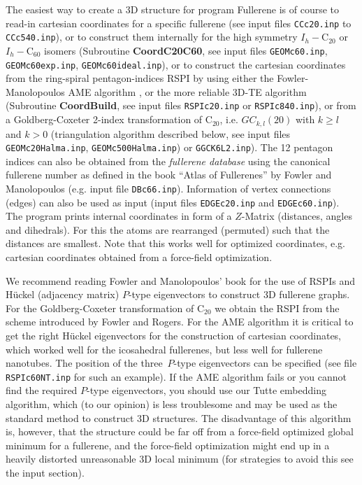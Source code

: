 \documentclass[article,a4paper,twoside]{memoir}
\newcommand{\C}[1]{\ensuremath{\mathrm{C}_{#1}}}
\newcommand{\filename}[1]{\texttt{#1}}
\newcommand{\funname}[1]{{\color{blue}\textbf{#1}}}
\begin{document}
The easiest way to create a 3D structure for program Fullerene is of course to read-in cartesian coordinates for a specific
fullerene (see input files \filename{CCc20.inp} to \filename{CCc540.inp}), or to construct them internally for the high
symmetry $I_h-$\C{20} or $I_h-$\C{60} isomers (Subroutine \funname{CoordC20C60}, see input files \filename{GEOMc60.inp},
\filename{GEOMc60exp.inp}, \filename{GEOMc60ideal.inp}), or to construct the cartesian coordinates from the ring-spiral
pentagon-indices RSPI by using either the Fowler-Manolopoulos AME algorithm \cite{Atlas},
or the more reliable 3D-TE algorithm (Subroutine \funname{CoordBuild}, see input files \filename{RSPIc20.inp} or \filename{RSPIc840.inp}),
or from a Goldberg-Coxeter 2-index transformation of \C{20}, i.e. $GC_{k,l}(20)$ with $k \geq l$ and $k > 0$
(triangulation algorithm described below, see input files \filename{GEOMc20Halma.inp}, \filename{GEOMc500Halma.inp}) or \filename{GGCK6L2.inp}). 
The 12 pentagon indices can also be obtained from the \textit{fullerene database} using 
the canonical fullerene number as defined in the book ``Atlas of Fullerenes'' by Fowler and Manolopoulos \cite{Atlas,cvetkovic2002} 
(e.g. input file \filename{DBc66.inp}). Information of vertex connections (edges) can also be used as input 
(input files \filename{EDGEc20.inp} and \filename{EDGEc60.inp}).
The program prints internal coordinates in form of a $Z$-Matrix (distances, angles and dihedrals).
For this the atoms are rearranged (permuted) such that the distances are smallest. Note that this works well for optimized
coordinates, e.g. cartesian coordinates obtained from a force-field optimization.

We recommend reading Fowler and Manolopoulos' book \cite{Atlas,cvetkovic2002} for the use of RSPIs and H\"uckel (adjacency matrix) $P$-type eigenvectors 
to construct 3D fullerene graphs. For the Goldberg-Coxeter transformation of \C{20} we obtain the RSPI from the scheme introduced by
Fowler and Rogers.\cite{Rogers} For the AME algorithm it is critical to get the right 
H\"uckel eigenvectors for the construction of cartesian coordinates,\cite{Atlas} which worked well for the icosahedral
fullerenes, but less well for fullerene nanotubes. 
The position of the three~$P$-type eigenvectors can be specified (see file \filename{RSPIc60NT.inp} for such an example).
If the AME algorithm fails or you cannot find the required $P$-type eigenvectors, you should use our Tutte embedding algorithm,
which (to our opinion) is less troublesome and may be used as the standard method to construct 3D structures. The disadvantage
of this algorithm is, however, that the structure could be far off from a force-field optimized global minimum for a fullerene, and the
force-field optimization might end up in a heavily distorted unreasonable 3D local minimum (for strategies to avoid this
see the input section).
\end{document}
